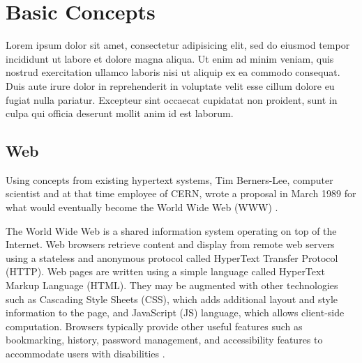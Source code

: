 \chapter{Basic Concepts} %
\label{cha:basic_concepts}

Lorem ipsum dolor sit amet, consectetur adipisicing elit, sed do eiusmod
tempor incididunt ut labore et dolore magna aliqua. Ut enim ad minim veniam,
quis nostrud exercitation ullamco laboris nisi ut aliquip ex ea commodo
consequat. Duis aute irure dolor in reprehenderit in voluptate velit esse
cillum dolore eu fugiat nulla pariatur. Excepteur sint occaecat cupidatat non
proident, sunt in culpa qui officia deserunt mollit anim id est laborum.
%
%
\section{Web} %
\label{sec:basic_concepts:web}

Using concepts from existing hypertext systems, Tim Berners-Lee, computer scientist and at that time employee of CERN, wrote a proposal in March 1989 for what would eventually become the World Wide Web (WWW) \cite{WC2006}.

The World Wide Web is a shared information system operating on top of the Internet. Web browsers retrieve content and display from remote web servers using a stateless and anonymous protocol called HyperText Transfer Protocol (HTTP). Web pages are written using a simple language called HyperText Markup Language (HTML). They may be augmented with other technologies such as Cascading Style Sheets (CSS), which adds additional layout and style information to the page, and JavaScript (JS) language, which allows client-side computation. Browsers typically provide other useful features such as bookmarking, history, password management, and accessibility features to accommodate users with disabilities \cite{Grosskurth2005}.

